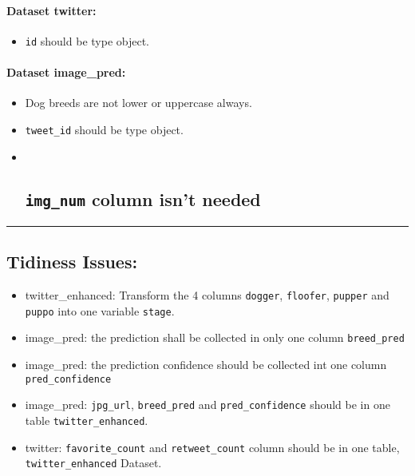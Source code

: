 \documentclass[11pt]{article}
\providecommand{\tightlist}{%
      \setlength{\itemsep}{0pt}\setlength{\parskip}{0pt}}
\begin{document}
\hypertarget{dataset-twitter}{%
\paragraph{Dataset twitter:}\label{dataset-twitter}}

\begin{itemize}
\tightlist
\item
  \texttt{id} should be type object.
\end{itemize}

\hypertarget{dataset-image_pred}{%
\paragraph{Dataset image\_pred:}\label{dataset-image_pred}}

\begin{itemize}
\item
  Dog breeds are not lower or uppercase always.
\item
  \texttt{tweet\_id} should be type object.
\item ~
  \hypertarget{img_num-column-isnt-needed}{%
  \subsection{\texorpdfstring{\texttt{img\_num} column isn't
  needed}{img\_num column isn't needed}}\label{img_num-column-isnt-needed}}
\end{itemize}

    \begin{center}\rule{0.5\linewidth}{0.5pt}\end{center}

\hypertarget{tidiness-issues}{%
\subsection{Tidiness Issues:}\label{tidiness-issues}}

\begin{itemize}
\tightlist
\item
  twitter\_enhanced: Transform the 4 columns \texttt{dogger},
  \texttt{floofer}, \texttt{pupper} and \texttt{puppo} into one variable
  \texttt{stage}.
\item
  image\_pred: the prediction shall be collected in only one column
  \texttt{breed\_pred}
\item
  image\_pred: the prediction confidence should be collected int one
  column \texttt{pred\_confidence}
\item
  image\_pred: \texttt{jpg\_url}, \texttt{breed\_pred} and
  \texttt{pred\_confidence} should be in one table
  \texttt{twitter\_enhanced}.
\item
  twitter: \texttt{favorite\_count} and \texttt{retweet\_count} column
  should be in one table, \texttt{twitter\_enhanced} Dataset.
\end{itemize}
\end{document}

